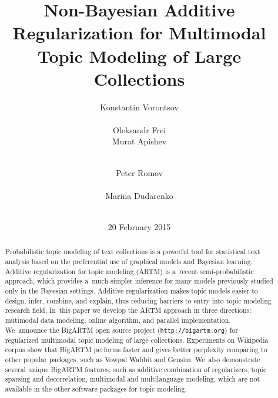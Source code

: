 \documentclass{sig-alternate}
\begin{document}
\title{
    Non-Bayesian Additive Regularization for Multimodal Topic Modeling of Large Collections
}
\author{
    \alignauthor
        Konstantin Vorontsov\\
        \\
    \alignauthor
        Oleksandr Frei\\
    \alignauthor
        Murat Apishev\\
        \\
    \and
    \alignauthor
        Peter Romov\\
        \\
    \alignauthor
        Marina Dudarenko\\
        \\
}
\date{20 February 2015}
\maketitle

\begin{abstract}
Probabilistic topic modeling of text collections is a powerful tool for statistical text analysis
based on the preferential use of graphical models and Bayesian learning.
Additive regularization for topic modeling (ARTM) is a~recent semi-probabilistic approach, which
provides a~much simpler inference for many models previously studied only in the Bayesian settings.
Additive regularization makes topic models easier to design, infer, combine, and explain,
thus reducing barriers to entry into topic modeling research field.
In~this paper we develop the ARTM approach in three directions:
mutimodal data modeling, online algorithm, and parallel implementation.
We~announce the \mbox{BigARTM} open source project (\texttt{http://bigartm.org})
for regularized multimodal topic modeling of large collections.
Experiments on Wikipedia corpus show that BigARTM performs faster and gives better perplexity
comparing to other popular packages, such as Vowpal Wabbit and Gensim.
We~also demonstrate several unique BigARTM features, such as
additive combination of regularizers,
topic sparsing and decorrelation,
multimodal and multilanguage modeling,
which are not available in the other software packages for topic modeling.
\end{abstract}
\end{document}
